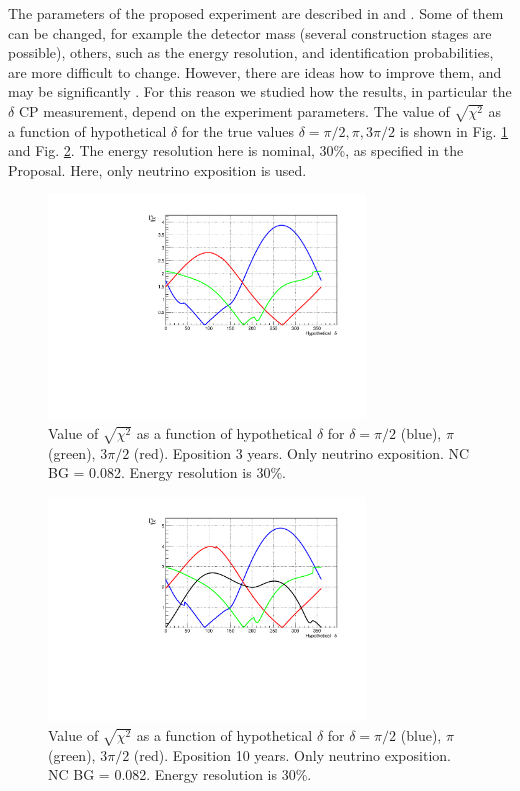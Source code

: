 \documentclass[prd,showpacs,groupedaddress,superscriptaddress,amsmath,amssymb]{revtex4-2} %
\begin{document}
 The parameters of the proposed experiment are described in \cite{Akindinov:2019flp} and \cite{KM3NET}. Some of them can be changed,
for example the detector mass (several construction stages are possible), others, such as the energy resolution, and identification probabilities,
are more difficult to change. However, there are ideas how to improve them, and may be significantly \cite{Perrin_Terrin_2022}.
For this reason we studied how the results, in particular the $\delta$ CP measurement, depend on the experiment parameters.
 The value of $\sqrt{\chi^2}$ as a function of hypothetical $\delta$ for the true values $\delta = \pi/2, \pi, 3\pi/2$ is shown
in Fig. \ref{fig:del} and Fig. \ref{fig:del_10}. The energy resolution here is nominal, 30\%, as specified in the Proposal.
Here, only neutrino exposition is used.

\begin{figure}[h]
\begin{center}
\includegraphics[width=0.75\textwidth]{del.pdf}
\caption {Value of $\sqrt{\chi^2}$ as a function of hypothetical $\delta$ for $\delta = \pi/2$ (blue), $\pi$ (green), $3\pi/2$ (red). Eposition 3 years.
Only neutrino exposition. NC BG = 0.082. Energy resolution is 30\%.
\label{fig:del}}
\end{center} 
\end{figure}

\begin{figure}[h]
\begin{center}
\includegraphics[width=0.75\textwidth]{del_10.pdf}
\caption {Value of $\sqrt{\chi^2}$ as a function of hypothetical $\delta$ for $\delta = \pi/2$ (blue), $\pi$ (green), $3\pi/2$ (red). Eposition 10 years.
Only neutrino exposition. NC BG = 0.082. Energy resolution is 30\%.
\label{fig:del_10}}
\end{center} 
\end{figure}
\end{document}
